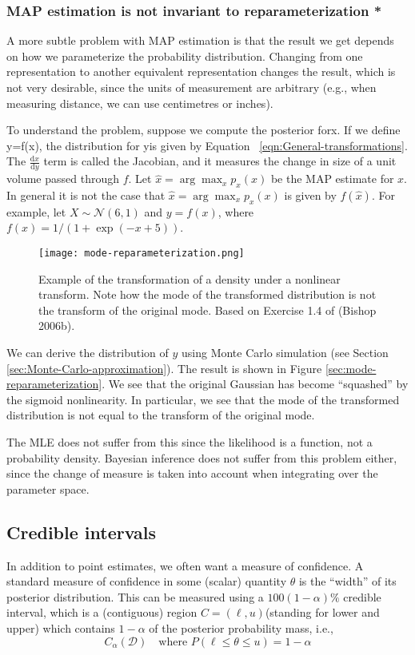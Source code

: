\subsubsection{MAP estimation is not invariant to reparameterization *}
A more subtle problem with MAP estimation is that the result we get depends on how we parameterize the probability distribution. Changing from one representation to another equivalent representation changes the result, which is not very desirable, since the units of measurement are arbitrary (e.g., when measuring distance, we can use centimetres or inches).

To understand the problem, suppose we compute the posterior forx. If we define y=f(x), the distribution for yis given by Equation ~\eqref{eqn:General-transformations}. The $\frac{\mathrm{d}x}{\mathrm{d}y}$ term is called the Jacobian, and it measures the change in size of a unit volume passed
through $f$. Let $\hat{x}=\arg\max_x p_x(x)$ be the MAP estimate for $x$. In general it is not the case that $\hat{x}=\arg\max_x p_x(x)$ is given by $f(\hat{x})$. For example, let $X \sim \mathcal{N}(6,1)$ and $y=f(x)$, where $f(x)=1/(1+\exp(-x+5))$. 

\begin{figure}[hbtp]
\centering
    \texttt{[image: mode-reparameterization.png]}
\caption{Example of the transformation of a density under a nonlinear transform. Note how the mode of the transformed distribution is not the transform of the original mode. Based on Exercise 1.4 of (Bishop 2006b).}
\label{fig:mode-reparameterization} 
\end{figure}

We can derive the distribution of $y$ using Monte Carlo simulation (see Section \ref{sec:Monte-Carlo-approximation}). The result is shown in Figure \ref{sec:mode-reparameterization}. We see that the original Gaussian has become “squashed” by the sigmoid nonlinearity. In particular, we see that the mode of the transformed distribution is not equal to the transform of the original mode.

The MLE does not suffer from this since the likelihood is a function, not a probability density. Bayesian inference does not suffer from this problem either, since the change of measure is taken into account when integrating over the parameter space.


\subsection{Credible intervals}
\label{sec:Credible-intervals}
In addition to point estimates, we often want a measure of confidence. A standard measure of confidence in some (scalar) quantity $\theta$ is the “width” of its posterior distribution. This can be measured using a $100(1−\alpha)\%$ credible interval, which is a (contiguous) region $C=(\ell,u)$(standing for lower and upper) which contains $1−\alpha$ of the posterior probability mass, i.e.,
\begin{equation}
C_{\alpha}(\mathcal{D}) \quad \text{where } P(\ell \leq \theta \leq u)=1-\alpha
\end{equation}

